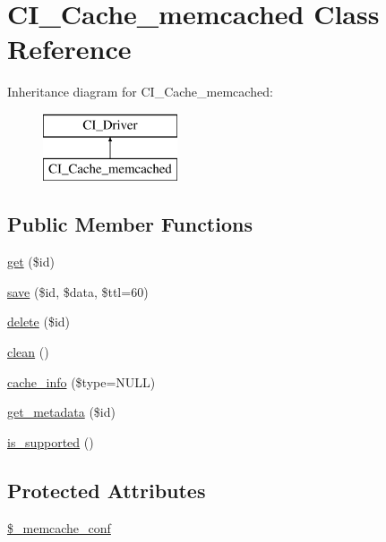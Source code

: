 \hypertarget{class_c_i___cache__memcached}{\section{C\-I\-\_\-\-Cache\-\_\-memcached Class Reference}
\label{class_c_i___cache__memcached}
}
Inheritance diagram for C\-I\-\_\-\-Cache\-\_\-memcached\-:\begin{figure}[H]
\begin{center}
\leavevmode
\includegraphics[height=2.000000cm]{class_c_i___cache__memcached}
\end{center}
\end{figure}
\subsection*{Public Member Functions}
\begin{DoxyCompactItemize}
\item 
\hyperlink{class_c_i___cache__memcached_a50e3bfb586b2f42932a6a93f3fbb0828}{get} (\$id)
\item 
\hyperlink{class_c_i___cache__memcached_a747c50183a4ed7009899628fa75c562b}{save} (\$id, \$data, \$ttl=60)
\item 
\hyperlink{class_c_i___cache__memcached_a2f8258add505482d7f00ea26493a5723}{delete} (\$id)
\item 
\hyperlink{class_c_i___cache__memcached_adb40b812890a8bc058bf6b7a0e1a54d9}{clean} ()
\item 
\hyperlink{class_c_i___cache__memcached_aa8b9c4d9f0387156736ccd8850f0727e}{cache\-\_\-info} (\$type=N\-U\-L\-L)
\item 
\hyperlink{class_c_i___cache__memcached_a59635cf18e997c5141bffa05ff7622e0}{get\-\_\-metadata} (\$id)
\item 
\hyperlink{class_c_i___cache__memcached_a98c68fd153468bc148c4ed8c716859fc}{is\-\_\-supported} ()
\end{DoxyCompactItemize}
\subsection*{Protected Attributes}
\begin{DoxyCompactItemize}
\item 
\hyperlink{class_c_i___cache__memcached_a31577b029b5c3ce5002b0d30ac01b261}{\$\-\_\-memcache\-\_\-conf}
\end{DoxyCompactItemize}


